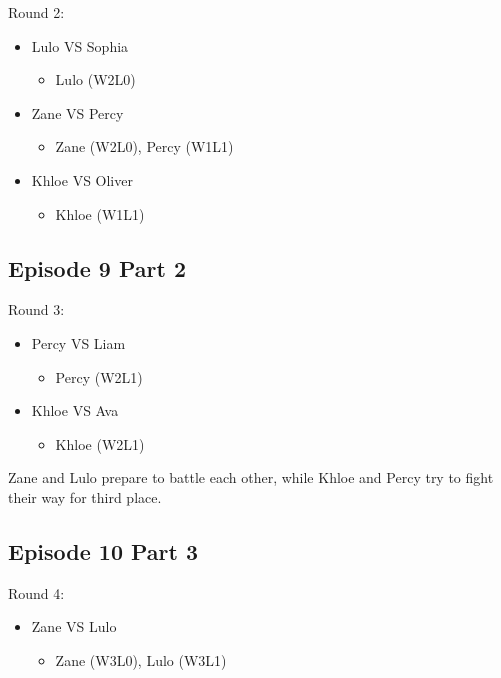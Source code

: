\par \noindent Round 2: 

\begin{itemize}
   \item Lulo VS Sophia
   \begin{itemize}
      \item Lulo (W2L0)
   \end{itemize}
   \item Zane VS Percy
   \begin{itemize}
      \item Zane (W2L0), Percy (W1L1)
   \end{itemize}
   \item Khloe VS Oliver
   \begin{itemize}
      \item Khloe (W1L1)
   \end{itemize}
\end{itemize}

\subsection*{Episode 9 Part 2}

\par \noindent Round 3:
\begin{itemize}
   \item Percy VS Liam
   \begin{itemize}
      \item Percy (W2L1)
   \end{itemize}
   \item Khloe VS Ava
   \begin{itemize}
      \item Khloe (W2L1)
   \end{itemize}
\end{itemize}

\par \noindent Zane and Lulo prepare to battle each other, while Khloe and Percy try to fight their way for third place.

\newpage

\subsection*{Episode 10 Part 3}
\par \noindent Round 4:
\begin{itemize}
   \item Zane VS Lulo
   \begin{itemize}
      \item Zane (W3L0), Lulo (W3L1)
   \end{itemize}
\end{itemize}
    
